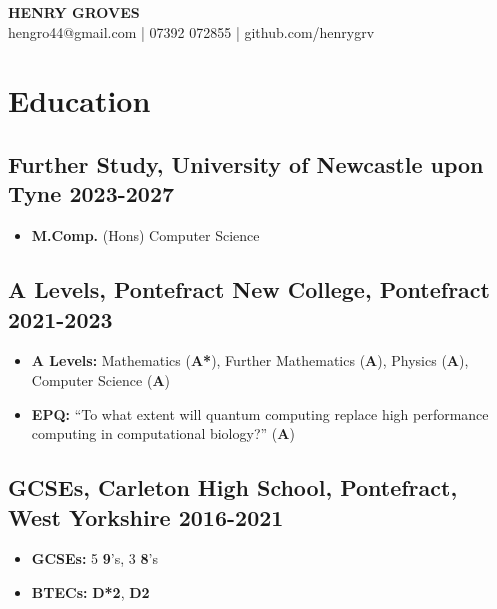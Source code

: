 \documentclass[9pt]{extarticle}
\makeatletter
\renewcommand{\maketitle}{
	\begin{center}
		{\huge\bfseries HENRY GROVES\\}
		\vspace{.5em}
		{\large hengro44@gmail.com | 07392 072855 | github.com/henrygrv}
	\end{center}
}
\makeatother
\begin{document}
\thispagestyle{empty}
\maketitle

\begin{minipage}{0.97\textwidth}
	\section{Education}
	\subsection{Further Study, University of Newcastle upon Tyne \hfill 2023-2027}
	\vspace{-.2cm}
	\begin{itemize}
		\item \textbf{M.Comp.} (Hons) Computer Science
	\end{itemize}
	\vspace{-.6cm}
	\subsection{A Levels, Pontefract New College, Pontefract \hfill 2021-2023}
	\vspace{-0.2cm}
	\begin{itemize}
		\item {\bfseries A Levels:} Mathematics (\textbf{A*}), Further Mathematics (\textbf{A}), Physics (\textbf{A}), Computer Science (\textbf{A})
		      \vspace{-.1cm}
		\item {\bfseries EPQ: } ``To what extent will quantum computing replace high performance computing in computational biology?'' (\textbf{A})
	\end{itemize}
	\vspace{-.4cm}
	\normalsize
	\vspace{-.2cm}
	\subsection{GCSEs, Carleton High School, Pontefract, West Yorkshire \hfill 2016-2021}
	\vspace{-0.5cm}
	\begin{multicols}{3}
		\begin{itemize}
			\item \textbf{GCSEs:} 5 \textbf{9}'s, 3 \textbf{8}'s
			\item \textbf{BTECs:} \textbf{D*2}, \textbf{D2}
		\end{itemize}
	\end{multicols}

\end{minipage}
\vspace{.3cm}
\end{document}
